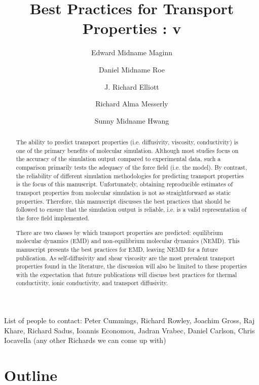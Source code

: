 \documentclass[9pt]{livecoms}
\title{Best Practices for Transport Properties : v\versionnumber}
\author[1*,\authfn{1}\authfn{3}]{Edward Midname Maginn}
\author[2\authfn{1}\authfn{4}]{Daniel Midname Roe}
\author[3\authfn{1}\authfn{5}]{J. Richard Elliott}
\author[4\authfn{1}\authfn{6}]{Richard Alma Messerly}
\author[5\authfn{1}\authfn{7}]{Sunny Midname Hwang}
\affil[1]{Maginn's institution}
\affil[2]{Roe's institution}
\affil[3]{Elliott's institution}
\affil[4]{National Institute of Standards and Technology}
\affil[5]{Hwang's institution}
\begin{document}
\maketitle

\begin{abstract}

The ability to predict transport properties (i.e. diffusivity, viscosity, conductivity) is one of the primary benefits of molecular simulation. Although most studies focus on the accuracy of the simulation output compared to experimental data, such a comparison primarily tests the adequacy of the force field (i.e. the model). By contrast, the reliability of different simulation methodologies for predicting transport properties is the focus of this manuscript. Unfortunately, obtaining reproducible estimates of transport properties from molecular simulation is not as straightforward as static properties. Therefore, this manuscript discusses the best practices that should be followed to ensure that the simulation output is reliable, i.e. is a valid representation of the force field implemented.

There are two classes by which transport properties are predicted: equilibrium molecular dynamics (EMD) and non-equilibrium molecular dynamics (NEMD). This manuscript presents the best practices for EMD, leaving NEMD for a future publication. As self-diffusivity and shear viscosity are the most prevalent transport properties found in the literature, the discussion will also be limited to these properties with the expectation that future publications will discuss best practices for thermal conductivity, ionic conductivity, and transport diffusivity.

\end{abstract}

List of people to contact: Peter Cummings, Richard Rowley, Joachim Gross, Raj Khare, Richard Sadus, Ioannis Economou, Jadran Vrabec, Daniel Carlson, Chris Iocavella (any other Richards we can come up with)


\section{Outline}
\end{document}
